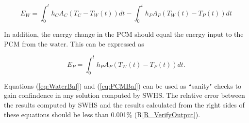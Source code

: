 \documentclass[12pt]{article}
\newcommand{\rref}[1]{R\ref{#1}}
\newcommand{\progname}{SWHS}
\begin{document}
\begin{equation}
E_W = \int_{0}^{t} h_C A_C (T_C - T_W(t)) dt - \int_{0}^{t} h_P A_P (T_W(t) - T_P(t)) dt \label{eq:WaterBal}
\end{equation}

\noindent
In addition, the energy change in the PCM should equal the energy input to 
the PCM from the water.  This can be expressed as

\begin{equation}
E_{P} = \int_{0}^{t} h_{P} A_{P} (T_{W}(t) - T_{P}(t)) dt. \label{eq:PCMBal}
\end{equation}

\noindent
Equations (\ref{eq:WaterBal}) and (\ref{eq:PCMBal}) can be used as ``sanity" checks
to gain confindence in any solution computed by \progname{}. The relative error 
between the results computed by \progname{} and the results calculated from the
right sides of these equations should be less than 0.001\% (\rref{R_VerifyOutput}).
\end{document}
